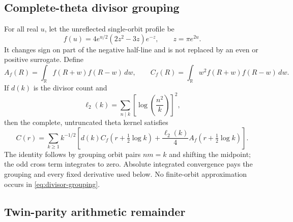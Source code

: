 \documentclass[11pt]{article}
\theoremstyle{definition}
\theoremstyle{remark}
\newcommand{\R}{\mathbb{R}}
\begin{document}
\subsection{Complete-theta divisor grouping}

For all real $u$, let the unreflected single-orbit profile be
\begin{equation}
 f(u)=4e^{u/2}(2z^2-3z)e^{-z},\qquad z=\pi e^{2u}.
\end{equation}
It changes sign on part of the negative half-line and is not replaced by an
even or positive surrogate. Define
\begin{equation}
 A_f(R)=\int_{\R}f(R+w)f(R-w)\,dw,\qquad
 C_f(R)=\int_{\R}w^2f(R+w)f(R-w)\,dw.
\end{equation}
If $d(k)$ is the divisor count and
\begin{equation}
 \ell_2(k)=\sum_{n\mid k}\left[\log\left(\frac{n^2}{k}\right)\right]^2,
\end{equation}
then the complete, untruncated theta kernel satisfies
\begin{equation}
 C(r)=\sum_{k\ge1}k^{-1/2}\left[
 d(k)C_f\!\left(r+\tfrac12\log k\right)
 +\frac{\ell_2(k)}4A_f\!\left(r+\tfrac12\log k\right)
 \right].
 \label{eq:divisor-grouping}
\end{equation}
The identity follows by grouping orbit pairs $nm=k$ and shifting the midpoint;
the odd cross term integrates to zero. Absolute integrated convergence pays
the grouping and every fixed derivative used below. No finite-orbit
approximation occurs in \eqref{eq:divisor-grouping}.

\subsection{Twin-parity arithmetic remainder}
\end{document}
